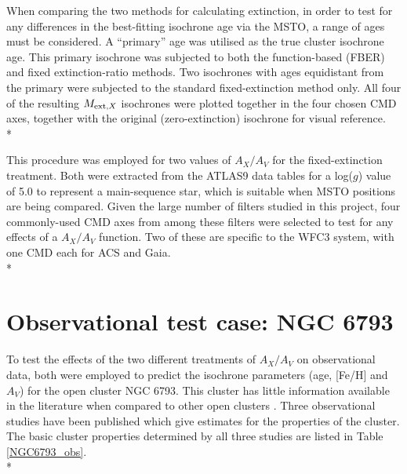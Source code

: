 \documentclass[12pt, a4paper]{report}
\begin{document}
When comparing the two methods for calculating extinction, in order to test for any differences in the best-fitting isochrone age via the MSTO, a range of ages must be considered. A ``primary'' age was utilised as the true cluster isochrone age. This primary isochrone was subjected to both the function-based (FBER) and fixed extinction-ratio methods. Two isochrones with ages equidistant from the primary were subjected to the standard fixed-extinction method only. All four of the resulting $M_{\textnormal{ext},X}$ isochrones were plotted together in the four chosen CMD axes, together with the original (zero-extinction) isochrone for visual reference.\\*

This procedure was employed for two values of $A_{X}/A_{V}$ for the fixed-extinction treatment. Both were extracted from the ATLAS9 data tables for a log($g$) value of 5.0 to represent a main-sequence star, which is suitable when MSTO positions are being compared. Given the large number of filters studied in this project, four commonly-used CMD axes from among these filters were selected to test for any effects of a $A_{X}/A_{V}$ function. Two of these are specific to the WFC3 system, with one CMD each for ACS and Gaia.\\*

\section{Observational test case: NGC 6793} \label{obs_ngc_section}
To test the effects of the two different treatments of $A_{X}/A_{V}$ on observational data, both were employed to predict the isochrone parameters (age, [Fe/H] and $A_{V}$) for the open cluster NGC 6793. This cluster has little information available in the literature when compared to other open clusters \citep{2019A&A...623A.108B}. Three observational studies have been published which give estimates for the properties of the cluster. The basic cluster properties determined by all three studies are listed in Table \ref{NGC6793_obs}. \\*
\end{document}
